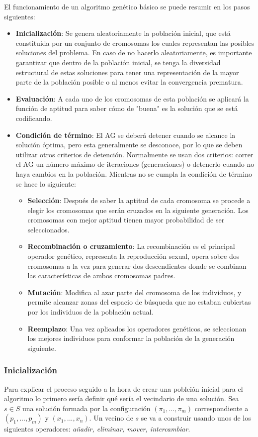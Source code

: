\documentclass[a4paper,10pt,twocolumn]{article}
\begin{document}
El funcionamiento de un algoritmo genético básico se puede resumir en los pasos siguientes:
\begin{itemize}
	\item \textbf{Inicialización}: Se genera aleatoriamente la población inicial, que está constituida por un conjunto de cromosomas los cuales representan las posibles soluciones del problema. En caso de no hacerlo aleatoriamente, es importante garantizar que dentro de la población inicial, se tenga la diversidad estructural de estas soluciones para tener una representación de la mayor parte de la población posible o al menos evitar la convergencia prematura.
	\item \textbf{Evaluación}: A cada uno de los cromosomas de esta población se aplicará la función de aptitud para saber cómo de "buena" es la solución que se está codificando.
	\item \textbf{Condición de término}: El AG se deberá detener cuando se alcance la solución óptima, pero esta generalmente se desconoce, por lo que se deben utilizar otros criterios de detención. Normalmente se usan dos criterios: correr el AG un número máximo de iteraciones (generaciones) o detenerlo cuando no haya cambios en la población. Mientras no se cumpla la condición de término se hace lo siguiente:
	\begin{itemize}
		\item \textbf{Selección}: Después de saber la aptitud de cada cromosoma se procede a elegir los cromosomas que serán cruzados en la siguiente generación. Los cromosomas con mejor aptitud tienen mayor probabilidad de ser seleccionados.
		\item \textbf{Recombinación o cruzamiento}: La recombinación es el principal operador genético, representa la reproducción sexual, opera sobre dos cromosomas a la vez para generar dos descendientes donde se combinan las características de ambos cromosomas padres.
		\item \textbf{Mutación}: Modifica al azar parte del cromosoma de los individuos, y permite alcanzar zonas del espacio de búsqueda que no estaban cubiertas por los individuos de la población actual.
		\item \textbf{Reemplazo}: Una vez aplicados los operadores genéticos, se seleccionan los mejores individuos para conformar la población de la generación siguiente. \cite{5}
	\end{itemize}
\end{itemize}

\subsubsection{Inicialización}
Para explicar el proceso seguido a la hora de crear una poblción inicial para el algoritmo lo primero sería definir qué sería el vecindario de una solución. Sea $s \in S$ una solución formada por la configuración $(\pi_1,...,\pi_m)$ correspondiente a $(p_1,...,p_m)$ y $(x_1,...,x_n)$. Un vecino de $s$ se va a construir usando unos de los siguientes operadores: \textit{añadir, eliminar, mover, intercambiar}. 
\end{document}
